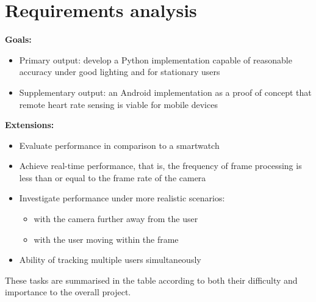 \section{Requirements analysis}
\textbf{Goals:}
\begin{itemize}
    \item Primary output: develop a Python implementation capable of reasonable accuracy under good lighting and for stationary users
    \item Supplementary output: an Android implementation as a proof of concept that remote heart rate sensing is viable for mobile devices
\end{itemize}
\textbf{Extensions:}
\begin{itemize}
   \item Evaluate performance in comparison to a smartwatch
   \item Achieve real-time performance, that is, the frequency of frame processing is less than or equal to the frame rate of the camera
   \item Investigate performance under more realistic scenarios:
        \begin{itemize}
            \item with the camera further away from the user
            \item with the user moving within the frame
        \end{itemize}
    \item Ability of tracking multiple users simultaneously
\end{itemize}
These tasks are summarised in the table according to both their difficulty and importance to the overall project.

